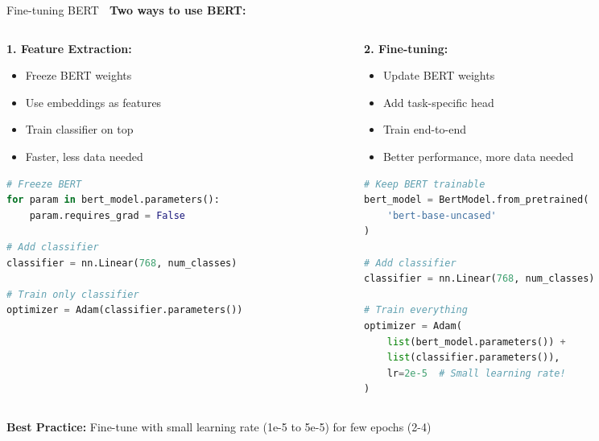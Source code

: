 \documentclass[aspectratio=169]{beamer}
\begin{document}
\begin{frame}[fragile]{Fine-tuning BERT 🎯}
\textbf{Two ways to use BERT:}

\vspace{1em}

\begin{columns}[T]
\begin{column}{0.48\textwidth}
\textbf{1. Feature Extraction:}
\begin{itemize}\setlength{\itemsep}{0pt}
    \item Freeze BERT weights
    \item Use embeddings as features
    \item Train classifier on top
    \item Faster, less data needed
\end{itemize}

\vspace{0.5em}
\begin{lstlisting}[language=Python]
# Freeze BERT
for param in bert_model.parameters():
    param.requires_grad = False

# Add classifier
classifier = nn.Linear(768, num_classes)

# Train only classifier
optimizer = Adam(classifier.parameters())
\end{lstlisting}
\end{column}

\begin{column}{0.48\textwidth}
\textbf{2. Fine-tuning:}
\begin{itemize}\setlength{\itemsep}{0pt}
    \item Update BERT weights
    \item Add task-specific head
    \item Train end-to-end
    \item Better performance, more data needed
\end{itemize}

\vspace{0.5em}
\begin{lstlisting}[language=Python]
# Keep BERT trainable
bert_model = BertModel.from_pretrained(
    'bert-base-uncased'
)

# Add classifier
classifier = nn.Linear(768, num_classes)

# Train everything
optimizer = Adam(
    list(bert_model.parameters()) +
    list(classifier.parameters()),
    lr=2e-5  # Small learning rate!
)
\end{lstlisting}
\end{column}
\end{columns}

\vspace{1em}
\textbf{Best Practice:} Fine-tune with small learning rate (1e-5 to 5e-5) for few epochs (2-4)
\end{frame}
\end{document}
